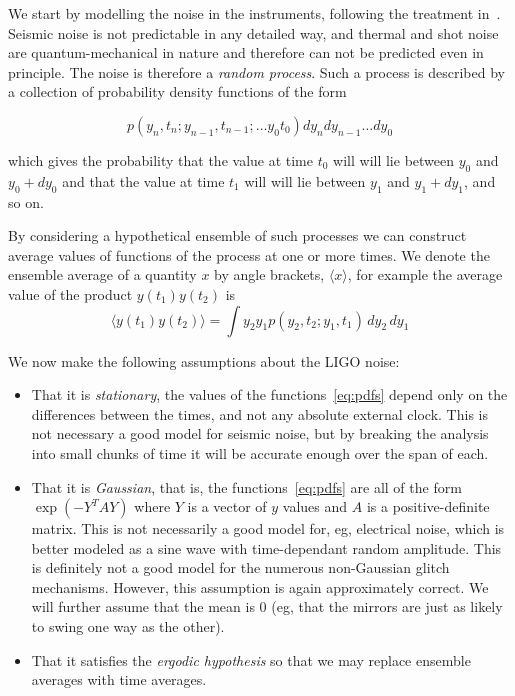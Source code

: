 We start by modelling the noise in the instruments, following the
treatment in~\cite{BlandfordThorne}.  Seismic noise is not predictable
in any detailed way, and thermal and shot noise are quantum-mechanical
in nature and therefore can not be predicted even in principle.  The
noise is therefore a \emph{random process}.  Such a process is
described by a collection of probability density functions of the form

\begin{equation*}
\label{eq:pdfs}
p(y_n, t_n; y_{n-1}, t_{n-1}; \ldots y_0 t_0) dy_n dy_{n-1} \ldots
dy_0
\end{equation*}

which gives the probability that the value at time $t_0$ will will
lie between $y_0$ and $y_0 + dy_0$ and that the value at time $t_1$
will will lie between $y_1$ and $y_1 + dy_1$, and so on.

By considering a hypothetical ensemble of such processes we can
construct average values of functions of the process at one or more
times.  We denote the ensemble average of a quantity $x$ by angle
brackets, $\langle x \rangle$, for example the average value of the product
$y(t_1)y(t_2)$ is
%
\begin{equation*}
\langle y(t_1) y(t_2) \rangle = \int y_2 y_1
p(y_2, t_2; y_1, t_1)\, dy_2\, dy_1
\end{equation*}

We now make the following assumptions about the LIGO noise:
%
\begin{itemize}
\item That it is \emph{stationary}, the values of the
functions~\ref{eq:pdfs} depend only on the differences between the
times, and not any absolute external clock.  This is not necessary a
good model for seismic noise, but by breaking the analysis into small
chunks of time it will be accurate enough over the span of each.

\item That it is \emph{Gaussian}, that is, the functions~\ref{eq:pdfs}
are all of the form $\exp(-Y^T A Y)$ where $Y$ is a vector of $y$
values and  $A$ is a positive-definite matrix.  This is not
necessarily a good model for, eg, electrical noise, which is better
modeled as a sine wave with time-dependant random amplitude.  This is
definitely not a good model for the numerous non-Gaussian glitch
mechanisms.  However, this assumption is again approximately correct.  We
will further assume that the mean is 0 (eg, that the mirrors are just
as likely to swing one way as the other).

\item That it satisfies the \emph{ergodic hypothesis} so that we may
replace ensemble averages with time averages.

\end{itemize}

